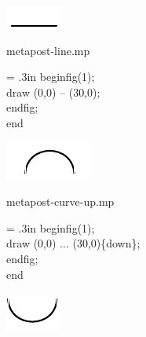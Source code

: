 \documentclass[danish,a2paper,22pt]{scrartcl}
\begin{document}
\begin{multicols*}{3}

\begin{spacing}{0.5}

\addtolength{\linewidth}{1in}
\color{Black}

\vspace{4cm}

\center
\includegraphics[scale=5]{metapoints/metapoints-1.pdf}
\vspace{1.5cm}

\flushleft
\color{White}
\romansmall
metapost-line.mp\\
\vspace{.4cm}
\color{Black}
\typewritersmall
{\leftskip = .3in %
beginfig(1);\\
draw (0,0) -- (30,0);\\
endfig;\\
end
\par}
\vspace{1.5cm}

\center
\includegraphics[scale=5]{metapoints/metapoints-2.pdf}
\vspace{1.5cm}

\flushleft
\color{White}
\romansmall
metapost-curve-up.mp\\
\vspace{.4cm}
\color{Black}
\typewritersmall
{\leftskip = .3in
beginfig(1);\\
draw (0,0) ... (30,0)\fontsize{15pt}{40pt}\{down\};\\
endfig;\\
end
\par}
\vspace{1.5cm}

\center
\includegraphics[scale=5]{metapoints/metapoints-3.pdf}
\vspace{1cm}


\end{spacing}
\end{multicols*}
\end{document}
